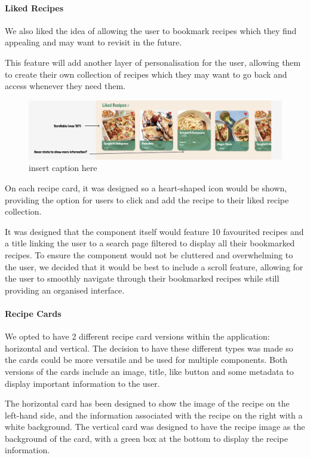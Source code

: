 \documentclass{article}
\begin{document}
\paragraph{Liked Recipes}
We also liked the idea of allowing the user to bookmark recipes which they find appealing and may want to revisit in the future.

This feature will add another layer of personalisation for the user, allowing them to create their own collection of recipes which they may want to go back and access whenever they need them.

\begin{figure}[h]
  \includegraphics[width=1.0\textwidth]{assets/Version 1 Liked Recipes.png}
  \centering
  \caption{insert caption here}
\end{figure}


On each recipe card, it was designed so a heart-shaped icon would be shown, providing the option for users to click and add the recipe to their liked recipe collection.

It was designed that the component itself would feature 10 favourited recipes and a title linking the user to a search page filtered to display all their bookmarked recipes. To ensure the component would not be cluttered and overwhelming to the user, we decided that it would be best to include a scroll feature, allowing for the user to smoothly navigate through their bookmarked recipes while still providing an organised interface.

\paragraph{Recipe Cards}
We opted to have 2 different recipe card versions within the application: horizontal and vertical. The decision to have these different types was made so the cards could be more versatile and be used for multiple components. Both versions of the cards include an image, title, like button and some metadata to display important information to the user.

The horizontal card has been designed to show the image of the recipe on the left-hand side, and the information associated with the recipe on the right with a white background. The vertical card was designed to have the recipe image as the background of the card, with a green box at the bottom to display the recipe information.
\end{document}
